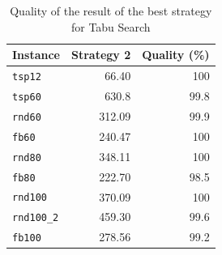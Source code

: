 	\begin{table}[]
		\centering
		\begin{tabular}{lrr}
			\toprule
			\textbf{Instance} & \textbf{Strategy 2}& \textbf{Quality (\%)}\\
			\toprule
			\verb|tsp12|           & 66.40      & 100	  \\
			\verb|tsp60|           & 630.8     & 99.8    \\
			\verb|rnd60|           & 312.09     & 99.9    \\
			\verb|fb60|            & 240.47     & 100     \\
			\verb|rnd80|           & 348.11      & 100     \\
			\verb|fb80|            & 222.70      & 98.5    \\
			\verb|rnd100|          & 370.09      & 100     \\
			\verb|rnd100_2|        & 459.30      & 99.6    \\
			\verb|fb100|           & 278.56      & 99.2        \\
			\bottomrule      
		\end{tabular}
		\caption{Quality of the result of the best strategy for Tabu Search}
		\label{tab:ts-result-q}
	\end{table}
		
		